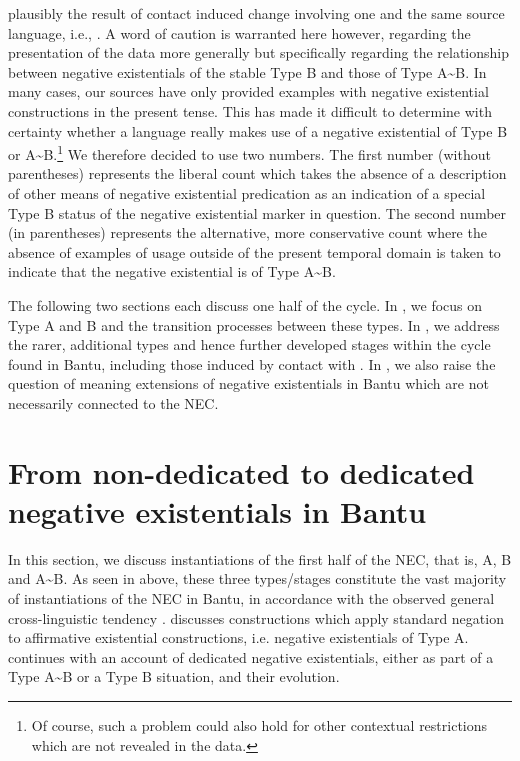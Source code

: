 \documentclass[output=paper]{langsci/langscibook}
\begin{document}
plausibly the result of contact induced change involving one and the same
source language, i.e., . A word of caution is warranted here
however, regarding the presentation of the data more generally but
specifically regarding the relationship between negative existentials of
the stable Type B and those of Type A{\textasciitilde}B. In many cases, our
sources have only provided examples with negative existential constructions
in the present tense. This has made it difficult to determine with
certainty whether a language really makes use of a negative existential of
Type B or A{\textasciitilde}B.\footnote{Of course, such a problem could
also hold for other contextual restrictions which are not revealed in the
data.} We therefore decided to use two numbers. The first number (without
parentheses) represents the liberal count which takes the absence of a
description of other means of negative existential predication as an
indication of a special Type B status of the negative existential marker in
question. The second number (in parentheses) represents the alternative,
more conservative count where the absence of examples of usage outside of
the present temporal domain is taken to indicate that the negative
existential is of Type A{\textasciitilde}B.

The following two sections each discuss one half of the cycle. In
, we focus on Type A and B and the transition processes
between these types. In , we address the rarer, additional
types and hence further developed stages within the cycle found in Bantu,
including those induced by contact with . In , we also raise the question of meaning extensions of negative existentials in Bantu which are not necessarily connected to the NEC.

\section{From non-dedicated to dedicated negative existentials in Bantu}\label{sec:1:5}
In this section, we discuss instantiations of the first half of the NEC,
that is, A, B and A{\textasciitilde}B. As seen in 
above, these three types/stages constitute the vast majority of
instantiations of the NEC in Bantu, in accordance with the observed general
cross-linguistic tendency \citep{Veselinova2016,Croft1991}.
 discusses constructions which apply standard negation
to affirmative existential constructions, i.e. negative existentials of
Type A.  continues with an account of dedicated negative
existentials, either as part of a Type A{\textasciitilde}B or a Type B
situation, and their evolution.
\end{document}
